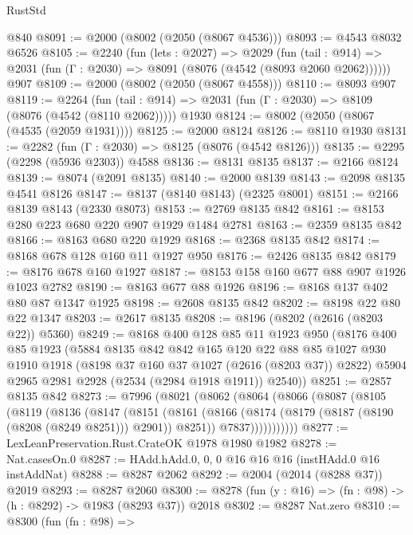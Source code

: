 \begin{lexlean}{RustStd}
\begin{coremodule}
    @840
@8091 := @2000 (@8002 (@2050 (@8067 @4536)))
@8093 := @4543 @8032 @6526
@8105 := @2240
    (fun (lets : @2027) =>
    @2029
      (fun (tail : @914) => @2031 (fun (Γ : @2030) => @8091 (@8076 (@4542 (@8093 @2060 @2062))))))
    @907
@8109 := @2000 (@8002 (@2050 (@8067 @4558)))
@8110 := @8093 @907
@8119 := @2264
    (fun (tail : @914) => @2031 (fun (Γ : @2030) => @8109 (@8076 (@4542 (@8110 @2062)))))
    @1930
@8124 := @8002 (@2050 (@8067 (@4535 (@2059 @1931))))
@8125 := @2000 @8124
@8126 := @8110 @1930
@8131 := @2282 (fun (Γ : @2030) => @8125 (@8076 (@4542 @8126)))
@8135 := @2295 (@2298 (@5936 @2303)) @4588
@8136 := @8131 @8135
@8137 := @2166 @8124
@8139 := @8074 (@2091 @8135)
@8140 := @2000 @8139
@8143 := @2098 @8135 @4541 @8126
@8147 := @8137 (@8140 @8143) (@2325 @8001)
@8151 := @2166 @8139 @8143 (@2330 @8073)
@8153 := @2769 @8135 @842
@8161 := @8153 @280 @223 @680 @220 @907 @1929 @1484 @2781
@8163 := @2359 @8135 @842
@8166 := @8163 @680 @220 @1929
@8168 := @2368 @8135 @842
@8174 := @8168 @678 @128 @160 @11 @1927 @950
@8176 := @2426 @8135 @842
@8179 := @8176 @678 @160 @1927
@8187 := @8153 @158 @160 @677 @88 @907 @1926 @1023 @2782
@8190 := @8163 @677 @88 @1926
@8196 := @8168 @137 @402 @80 @87 @1347 @1925
@8198 := @2608 @8135 @842
@8202 := @8198 @22 @80 @22 @1347
@8203 := @2617 @8135
@8208 := @8196 (@8202 (@2616 (@8203 @22)) @5360)
@8249 := @8168
    @400
    @128
    @85
    @11
    @1923
    @950
    (@8176
      @400
      @85
      @1923
      (@5884
        @8135
        @842
        @842
        @165
        @120
        @22
        @88
        @85
        @1027
        @930
        @1910
        @1918
        (@8198 @37 @160 @37 @1027 (@2616 (@8203 @37)) @2822)
        @5904
        @2965
        @2981
        @2928
        (@2534 (@2984 @1918 @1911))
        @2540))
@8251 := @2857 @8135 @842
@8273 := @7996
    (@8021
      (@8062
        (@8064
          (@8066
            (@8087
              (@8105
                (@8119
                  (@8136
                    (@8147
                      (@8151
                        (@8161
                          (@8166 (@8174 (@8179 (@8187 (@8190 (@8208 (@8249 @8251))) @2901)) @8251))
                          @7837)))))))))))
@8277 := LexLeanPreservation.Rust.CrateOK @1978 @1980 @1982
@8278 := Nat.casesOn.{0}
@8287 := HAdd.hAdd.{0, 0, 0} @16 @16 @16 (instHAdd.{0} @16 instAddNat)
@8288 := @8287 @2062
@8292 := @2004 (@2014 (@8288 @37)) @2019
@8293 := @8287 @2060
@8300 := @8278 (fun (y : @16) => (fn : @98) -> (h : @8292) -> @1983 (@8293 @37)) @2018
@8302 := @8287 Nat.zero
@8310 := @8300
    (fun (fn : @98) =>

\end{coremodule}
\end{lexlean}
